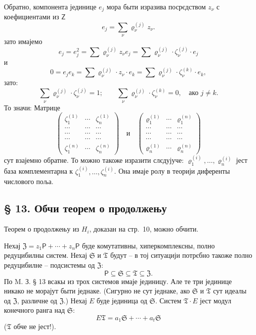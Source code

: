 \documentclass[11pt]{article}
\begin{document}
Обратно, компонента јединице \(e_j\) мора быти изразива посрєдством \(z_\nu\) с коефициентами из \(\mathsf Z\)
\[
e_j=\sum_\nu \varrho_\nu^{(j)}z_\nu .
\]
зато имајемо
\[
e_j=e_j^2=\sum \varrho_\nu^{(j)}z_\nu e_j
=\sum \varrho_\nu^{(j)}\cdot\zeta_\nu^{(j)}\cdot e_j
\]
и
\[
0=e_je_k=\sum \varrho_\nu^{(j)}\cdot z_\nu\cdot e_k
=\sum \varrho_\nu^{(j)}\cdot\zeta_\nu^{(k)}\cdot e_k,
\]
зато:
\[
\sum_\nu \varrho_\nu^{(j)}\cdot\zeta_\nu^{(j)}=1;
\qquad
\sum_\nu \varrho_\nu^{(j)}\cdot\zeta_\nu^{(k)}=0,\quad
\text{ако } j\ne k.
\]
То значи: Матрице
\[
\begin{pmatrix}
\zeta_1^{(1)} & \cdots & \zeta_n^{(1)}\\
\cdots & \cdots & \cdots\\
\cdots & \cdots & \cdots\\
\cdots & \cdots & \cdots\\
\zeta_1^{(n)} & \cdots & \zeta_n^{(n)}
\end{pmatrix}
\quad\text{и}\quad
\begin{pmatrix}
\varrho_1^{(1)} & \cdots & \varrho_1^{(n)}\\
\cdots & \cdots & \cdots\\
\cdots & \cdots & \cdots\\
\cdots & \cdots & \cdots\\
\varrho_n^{(1)} & \cdots & \varrho_n^{(n)}
\end{pmatrix}
\]
сут взајемно обратне. То можно такоже изразити слєдујуче: \(\varrho_1^{(i)},\ldots,\varrho_n^{(i)}\) јест база комплементарна к \(\zeta_1^{(i)},\ldots,\zeta_n^{(i)}\). Она имаје ролу в теорији диференты числового поља.

\subsection*{§ 13. Обчи теорем о продолжењу}\label{der-allgemeine-fortsetzungssatz}

Теорем о продолжењу из \(H_i\), доказан на стр.~10, можно обчити.

Нехај \(\mathfrak Z=z_1\mathsf P+\cdots+z_n\mathsf P\) буде комутативны, хиперкомплексны, полно редуцибилны систем. Нехај \(\mathfrak S\) и \(\mathfrak T\) будут -- в тој ситуацији потрєбно такоже полно редуцибилне -- подсистемы од \(\mathfrak Z\):
\[
\mathsf P\subseteq\mathfrak S\subseteq\mathfrak T\subseteq\mathfrak Z .
\]
По M. З. § 13 всакы из трох системов имаје јединицу. Але те три јединице никако не морајут быти једнаке. (Сигурно не сут једнаке, ако \(\mathfrak S\) и \(\mathfrak T\) сут идеалы од \(\mathfrak Z\), различне од \(\mathfrak Z\).) Нехај \(E\) буде јединица од \(\mathfrak S\). Систем \(\mathfrak T\cdot E\) јест модул конечного ранга над \(\mathfrak S\):
\[
E\mathfrak T=a_1\mathfrak S+\cdots+a_t\mathfrak S
\]
(\(\mathfrak T\) обче не јест!).
\end{document}
